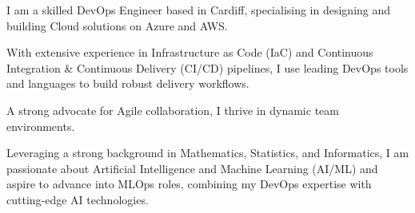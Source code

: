 
\vspace{0.15cm}

\begin{small}
  I am a skilled DevOps Engineer based in Cardiff, specialising in designing and building Cloud solutions on Azure and AWS.

  \vspace{0.5cm}

  With extensive experience in Infrastructure as Code (IaC) and Continuous Integration \& Continuous Delivery (CI/CD) pipelines, I use leading DevOps tools and languages to build robust delivery workflows.

  \vspace{0.5cm}

  A strong advocate for Agile collaboration, I thrive in dynamic team environments.

  \vspace{0.5cm}

  Leveraging a strong background in Mathematics, Statistics, and Informatics, I am passionate about Artificial Intelligence and Machine Learning (AI/ML) and aspire to advance into MLOps roles, combining my DevOps expertise with cutting-edge AI technologies.
\end{small}

